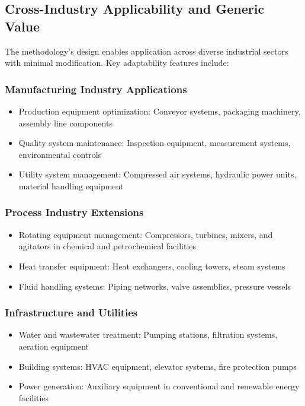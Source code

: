 \documentclass[twocolumn]{article}
\begin{document}
\subsection{Cross-Industry Applicability and Generic Value}

The methodology's design enables application across diverse industrial sectors with minimal modification. Key adaptability features include:

\subsubsection{Manufacturing Industry Applications}
\begin{itemize}
\item Production equipment optimization: Conveyor systems, packaging machinery, assembly line components
\item Quality system maintenance: Inspection equipment, measurement systems, environmental controls
\item Utility system management: Compressed air systems, hydraulic power units, material handling equipment
\end{itemize}

\subsubsection{Process Industry Extensions}
\begin{itemize}
\item Rotating equipment management: Compressors, turbines, mixers, and agitators in chemical and petrochemical facilities
\item Heat transfer equipment: Heat exchangers, cooling towers, steam systems
\item Fluid handling systems: Piping networks, valve assemblies, pressure vessels
\end{itemize}

\subsubsection{Infrastructure and Utilities}
\begin{itemize}
\item Water and wastewater treatment: Pumping stations, filtration systems, aeration equipment
\item Building systems: HVAC equipment, elevator systems, fire protection pumps
\item Power generation: Auxiliary equipment in conventional and renewable energy facilities
\end{itemize}
\end{document}
